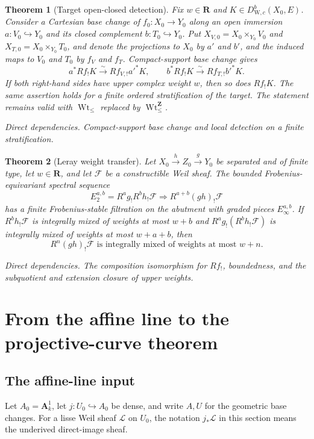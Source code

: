 \documentclass[10pt]{article}
\newtheorem{theorem}{Theorem}[section]
\theoremstyle{definition}
\newcommand{\DW}{D^b_{\mathrm W,c}}
\newcommand{\WtLe}{\operatorname{Wt}_{\leq}}
\newcommand{\IntWtLe}{\operatorname{Wt}^{\mathbf Z}_{\leq}}
\newcommand{\dep}[1]{\par\smallskip\noindent\textit{Direct dependencies.} #1\par}
\begin{document}
\begin{theorem}[Target open-closed detection]
Fix \(w\in\mathbf R\) and \(K\in\DW(X_0,E)\).  Consider a Cartesian base
change of \(f_0:X_0\to Y_0\) along an open
immersion \(a:V_0\hookrightarrow Y_0\) and its closed complement
\(b:T_0\hookrightarrow Y_0\).  Put
\(X_{V,0}=X_0\times_{Y_0}V_0\) and
\(X_{T,0}=X_0\times_{Y_0}T_0\), and denote the projections to \(X_0\) by
\(a'\) and \(b'\), and the induced maps to \(V_0\) and \(T_0\) by
\(f_V\) and \(f_T\).  Compact-support base change gives
\[
 a^*Rf_!K\xrightarrow{\sim}Rf_{V,!}a'^*K,
 \qquad
 b^*Rf_!K\xrightarrow{\sim}Rf_{T,!}b'^*K.
\]
If both right-hand sides have upper complex weight \(w\), then so does
\(Rf_!K\).  The same assertion holds for a finite ordered stratification of
the target.
The statement remains valid with \(\WtLe\) replaced by \(\IntWtLe\).
\dep{Compact-support base change and local detection on a finite
stratification.}
\end{theorem}

\begin{theorem}[Leray weight transfer]
Let \(X_0\xrightarrow h Z_0\xrightarrow gY_0\) be separated and of finite
type, let \(w\in\mathbf R\), and let \(\mathcal F\) be a constructible
Weil sheaf.  The bounded
Frobenius-equivariant spectral sequence
\[
 E_2^{a,b}=R^ag_!R^bh_!\mathcal F
       \Longrightarrow R^{a+b}(gh)_!\mathcal F
\]
has a finite Frobenius-stable filtration on the abutment with graded pieces
\(E_\infty^{a,b}\).  If \(R^bh_!\mathcal F\) is integrally mixed of
weights at most \(w+b\) and \(R^ag_!(R^bh_!\mathcal F)\) is integrally
mixed of weights at most \(w+a+b\), then
\[
             R^n(gh)_!\mathcal F
       \text{ is integrally mixed of weights at most }w+n.
\]
\dep{The composition isomorphism for \(Rf_!\), boundedness, and the
subquotient and extension closure of upper weights.}
\end{theorem}

\section{From the affine line to the projective-curve theorem}

\subsection{The affine-line input}

Let \(A_0=\mathbf A^1_k\), let \(j:U_0\hookrightarrow A_0\) be dense, and
write \(A,U\) for the geometric base changes.  For a lisse Weil sheaf
\(\mathcal L\) on \(U_0\), the notation \(j_*\mathcal L\) in this section
means the underived direct-image sheaf.
\end{document}

